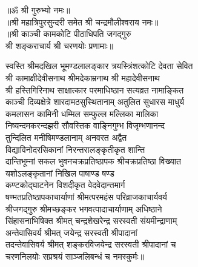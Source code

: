 \begin{center}
{॥ॐ श्री गुरुभ्यो नमः॥}\\
{॥श्री महात्रिपुरसुन्दरी समेत श्री चन्द्रमौलीश्वराय नमः॥}\\
{॥श्री काञ्ची कामकोटि पीठाधिपति जगद्गुरु\\ श्री शङ्कराचार्य श्री चरणयोः प्रणामाः॥}
\end{center}

\noindent स्वस्ति श्रीमदखिल भूमण्डलालङ्कार त्रयस्त्रिंशत्कोटि देवता सेवित\\
श्री कामाक्षीदेवीसनाथ श्रीमदेकाम्रनाथ श्री महादेवीसनाथ\\
 श्री हस्तिगिरिनाथ साक्षात्कार परमाधिष्ठान सत्यव्रत नामाङ्कित\\
 काञ्ची दिव्यक्षेत्रे शारदामठसुस्थितानाम् अतुलित सुधारस माधुर्य\\
 कमलासन कामिनी धम्मिल सम्फुल्ल मल्लिका मालिका\\
 निष्यन्दमकरन्दझरी सौवस्तिक वाङ्निगुम्भ विजृम्भणानन्द \\
तुन्दिलित मनीषिमण्डलानाम् अनवरत अद्वैत \\
विद्याविनोदरसिकानां निरन्तरालङ्कृतीकृत शान्ति\\
 दान्तिभूम्नां सकल भुवनचक्रप्रतिष्ठापक  श्रीचक्रप्रतिष्ठा विख्यात\\
 यशोऽलङ्कृतानां निखिल पाषाण्ड षण्ड\\
 कण्टकोद्घाटनेन विशदीकृत वेदवेदान्तमार्ग\\
 षण्मतप्रतिष्ठापकाचार्याणां  श्रीमत्परमहंस परिव्राजकाचार्यवर्य\\
श्रीजगद्गुरु श्रीमच्छङ्कर भगवत्पादाचार्याणाम्  अधिष्ठाने \\
सिंहासनाभिषिक्त श्रीमत् चन्द्रशेखरेन्द्र सरस्वती संयमीन्द्राणाम् \\
अन्तेवासिवर्य श्रीमत् जयेन्द्र सरस्वती श्रीपादानां \\
तदन्तेवासिवर्य श्रीमत् शङ्करविजयेन्द्र सरस्वती श्रीपादानां च\\
 चरणनिलयोः सप्रश्रयं साञ्जलिबन्धं च नमस्कुर्मः॥